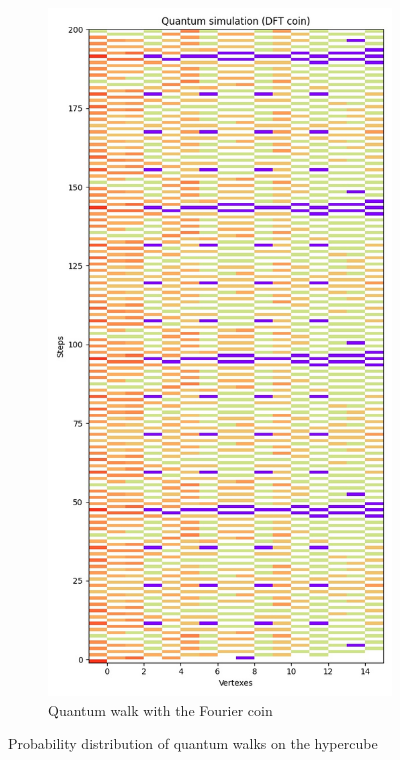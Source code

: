 \begin{figure}[H]
\begin{subfigure}{.45\linewidth}
  \end{subfigure}
  \begin{subfigure}{.45\linewidth}
    \centering
    \includegraphics[width=\linewidth]{./figures/results/hypercube/dft.jpg}
    \caption{Quantum walk with the Fourier coin}
  \end{subfigure}
  \caption{Probability distribution of quantum walks on the hypercube}
\end{figure}

